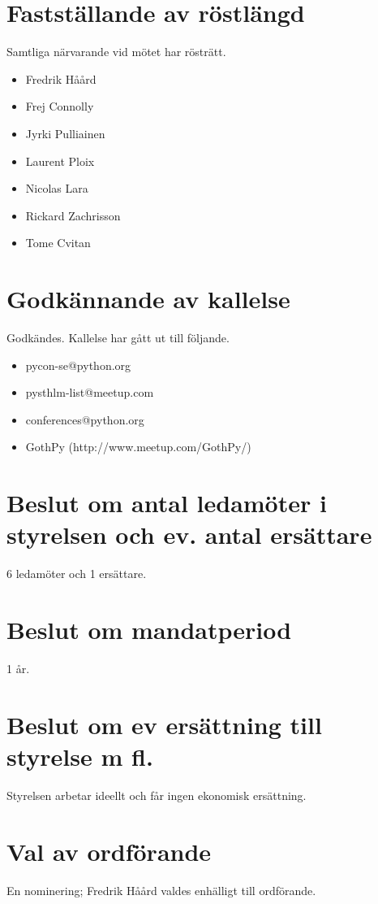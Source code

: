\documentclass[11pt, a4paper]{article}
\begin{document}
\section{Fastställande av röstlängd}
Samtliga närvarande vid mötet har rösträtt.

\begin{itemize}
    \item Fredrik Håård
    \item Frej Connolly
    \item Jyrki Pulliainen
    \item Laurent Ploix
    \item Nicolas Lara
    \item Rickard Zachrisson
    \item Tome Cvitan
\end{itemize}

\section{Godkännande av kallelse}
Godkändes. Kallelse har gått ut till följande.

\begin{itemize}
    \item pycon-se@python.org
    \item pysthlm-list@meetup.com
    \item conferences@python.org
    \item GothPy (http://www.meetup.com/GothPy/)
\end{itemize}

\section{Beslut om antal ledamöter i styrelsen och ev. antal ersättare}
6 ledamöter och 1 ersättare.

\section{Beslut om mandatperiod}
1 år.

\section{Beslut om ev ersättning till styrelse m fl.}
Styrelsen arbetar ideellt och får ingen ekonomisk ersättning.

\section{Val av ordförande}
En nominering; Fredrik Håård valdes enhälligt till ordförande.
\end{document}
